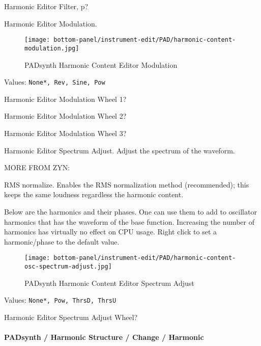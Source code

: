    Harmonic Editor Filter, p?

   Harmonic Editor Modulation.

\begin{figure}[H]
   \centering 
   \texttt{[image: bottom-panel/instrument-edit/PAD/harmonic-content-modulation.jpg]}
   \caption{PADsynth Harmonic Content Editor Modulation}
   \label{fig:padsynth_harmonic_content_editor_modulation}
\end{figure}

   Values: \texttt{None*, Rev, Sine, Pow}

   Harmonic Editor Modulation Wheel 1?

   Harmonic Editor Modulation Wheel 2?

   Harmonic Editor Modulation Wheel 3?

   Harmonic Editor Spectrum Adjust.
   Adjust the spectrum of the waveform.

   MORE FROM ZYN:

   RMS normalize. Enables the RMS normalization method (recommended); this
   keeps the same loudness regardless the harmonic content.

   Below are the harmonics and their phases. One can use them to add to
   oscillator harmonics that has the waveform of the base function.
   Increasing the number of harmonics has virtually no effect on CPU usage. 
   Right click to set a harmonic/phase to the default value. 

\begin{figure}[H]
   \centering 
   \texttt{[image: bottom-panel/instrument-edit/PAD/harmonic-content-osc-spectrum-adjust.jpg]}
   \caption{PADsynth Harmonic Content Editor Spectrum Adjust}
   \label{fig:padsynth_harmonic_content_editor_spectrum_adjust}
\end{figure}

   Values: \texttt{None*, Pow, ThrsD, ThrsU}

   Harmonic Editor Spectrum Adjust Wheel?

\paragraph{PADsynth / Harmonic Structure / Change / Harmonic}
\label{paragraph:padsynth_harmonic_structure_change_harmonic}

